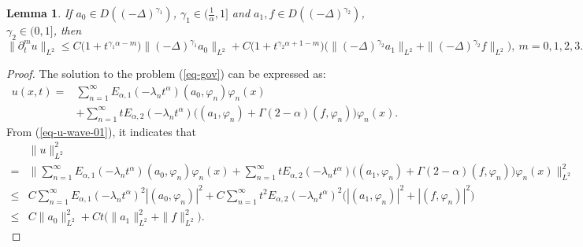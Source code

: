 \documentclass[11pt]{article}
\newtheorem{lemma}{Lemma}[section]
\numberwithin{equation}{section}
\begin{document}
\begin{lemma}\label{lem-reg-L2-2}
If $a_0\in D((-\Delta)^{\gamma_1})$, $\gamma_1\in(\frac{1}{\alpha},1]$ and $a_1,f\in D((-\Delta)^{\gamma_2})$, $\gamma_2\in(0,1]$, then
\[
\|\partial_{t}^mu\|_{L^2} \leq C\big(1+t^{\gamma_1\alpha-m}\big)\|(-\Delta)^{\gamma_1}a_0\|_{L^2}
+C\big(1+t^{\gamma_2\alpha+1-m}\big)\Big(\|(-\Delta)^{\gamma_2}a_1\|_{L^2}+\|(-\Delta)^{\gamma_2}f\|_{L^2}\Big),~m=0,1,2,3.
\]
\end{lemma}
\begin{proof}
The solution to the problem (\ref{eq-gov}) can be expressed as:
\begin{align}\nonumber
u(x,t)=&\sum_{n=1}^{\infty}E_{\alpha,1}(-\lambda_nt^\alpha)(a_0,\varphi_n)\varphi_n(x)\\\label{eq-u-wave-01}
&+\sum_{n=1}^{\infty} t E_{\alpha,2}(-\lambda_n t^\alpha)\Big((a_1, \varphi_n)+\Gamma(2-\alpha)(f, \varphi_n)\Big) \varphi_n(x).
\end{align}
From (\ref{eq-u-wave-01}), it indicates that
\begin{align*} 
&\|u\|_{L^2}^2\\
=&\bigg\|\sum_{n=1}^{\infty}E_{\alpha,1}(-\lambda_nt^\alpha)(a_0,\varphi_n)\varphi_n(x) +\sum_{n=1}^{\infty}t E_{\alpha,2}(-\lambda_n t^\alpha)\Big((a_1, \varphi_n)+\Gamma(2-\alpha)(f, \varphi_n)\Big)\varphi_n(x)\bigg\|_{L^2}^2\\ 
\leq& C\sum_{n=1}^{\infty}E_{\alpha,1}(-\lambda_nt^\alpha)^2|(a_0,\varphi_n)|^2 +C\sum_{n=1}^\infty t^2E_{\alpha,2}(-\lambda_n t^\alpha)^2\Big(|(a_1, \varphi_n)|^2+|(f, \varphi_n)|^2\Big)\\ 
\le& C\|a_0\|_{L^2}^2+Ct\Big(\|a_1\|_{L^2}^2+\|f\|_{L^2}^2\Big). 
\end{align*}


\end{proof}
\end{document}
